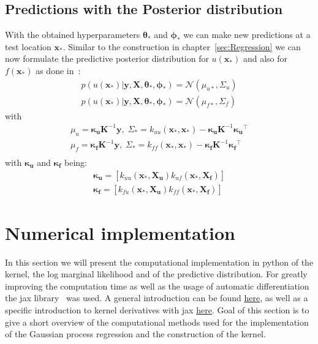\documentclass{article}
\begin{document}
\subsection{Predictions with the Posterior distribution}
With the obtained hyperparameters $\bm{\theta_*}$ and $\bm{\phi_*}$ we can make new predictions at a test location $\bm{x_*}$. Similar to the construction in chapter~\ref{sec:Regression} we can now formulate the predictive posterior distribution for $u(\bm{x_*})$ and also for $f(\bm{x_*})$ as done
in~\cite{RAISSI}:
\begin{equation}
    \begin{aligned}
        p(u(\bm{x_*})|\bm{y},\bm{X},\bm{\theta_*}, \bm{\phi_*}) = \mathcal{N}(\mu_{u*}, \Sigma_u) \\
        p(u(\bm{x_*})|\bm{y},\bm{X},\bm{\theta_*}, \bm{\phi_*}) = \mathcal{N}(\mu_{f*}, \Sigma_f)
    \end{aligned}
\end{equation}
with
\begin{equation}
    \begin{aligned}
        \label{eq:predictive_mean_cov}
        \mu_u = \bm{\kappa_u}\bm{K}^{-1}\bm{y}, \; \Sigma_* = k_{uu}(\bm{x_*,x_*}) - \bm{\kappa_u}\bm{K}^{-1}\bm{\kappa_u}^\intercal  \\
        \mu_f = \bm{\kappa_f}\bm{K}^{-1}\bm{y}, \;  \Sigma_* = k_{ff}(\bm{x_*,x_*}) - \bm{\kappa_f}\bm{K}^{-1}\bm{\kappa_f}^\intercal \\
    \end{aligned}
\end{equation}
with $\bm{\kappa_u}$ and $\bm{\kappa_f}$ being:
\begin{equation}
    \begin{aligned}
        \bm{\kappa_u} = [k_{uu}(\bm{x_*},\bm{X_u})k_{uf}(\bm{x_*,\bm{X_f}})] \\
        \bm{\kappa_f} = [k_{fu}(\bm{x_*},\bm{X_u})k_{ff}(\bm{x_*,\bm{X_f}})]
    \end{aligned}
\end{equation}
\newpage
\section{Numerical implementation}
In this section we will present the computational implementation in python of the kernel, the log marginal likelihood and of the predictive distribution. For greatly improving the computation time as well as the usage of automatic differentiation the jax library~\cite{jax2018github} was used. A general introduction can be found \href{https://jax.readthedocs.io/en/latest/notebooks/quickstart.html}{here}, as well as a specific introduction to kernel derivatives with jax \href{https://jejjohnson.github.io/research_notebook/content/notes/kernels/kernel_derivatives.html}{here}. Goal of this section is to give a short overview of the computational methods used for the implementation of the Gaussian process regression and the construction of the kernel.\\
\end{document}
